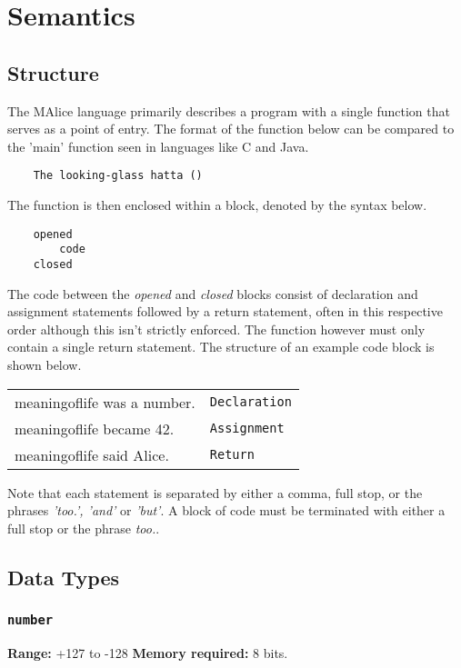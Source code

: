 \documentclass[a4wide, 10pt]{article}
\newcommand{\tab}{\hspace*{2em}}
\begin{document}
\section{Semantics}
\subsection{Structure}
The MAlice language primarily describes a program with a single function 
that serves as a point of entry. The format of the function below can be
compared to the 'main' function seen in languages like C and Java.

\begin{verbatim}
    The looking-glass hatta ()
\end{verbatim}

The function is then enclosed within a block, denoted by the syntax below.
\begin{verbatim}
    opened
        code
    closed
\end{verbatim}

The code between the \emph{opened} and \emph{closed} blocks consist of 
declaration and assignment statements followed by a return statement, 
often in this respective order although this isn't strictly enforced. The
function however must only contain a single return statement. The structure
of an example code block is shown below.


\begin{table}[h]
\begin{tabular}{l l}
\tab meaningoflife was a number. & \verb|Declaration| \\
\tab meaningoflife became 42. & \verb|Assignment| \\
\tab meaningoflife said Alice. & \verb|Return| \\
\end{tabular}
\end{table}
  
Note that each statement is separated by either a comma, full stop, or the 
phrases \emph{'too.', 'and'} or \emph{'but'}. A block of code must be 
terminated with either a full stop or the phrase \emph{too.}.

\subsection{Data Types}

\subsubsection{\texttt{number}}
{\bf Range:} +127 to -128 {\bf Memory required:} 8 bits.
 
\end{document}
